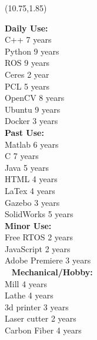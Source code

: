 \documentclass[]{article}
\begin{document}
\begin{textblock}{3}(10.75,1.85)
\colorbox{myblue}
{
\begin{minipage}{6cm}
\hspace{.25cm}
\begin{minipage}{5.5cm}
\begin{flushright}
\vspace*{-0.55cm}
\textbf{Daily Use:}\\
C++ 7 years\\
Python 9 years\\
ROS 9 years\\
Ceres 2 year\\
PCL 5 years \\
OpenCV 8 years\\
Ubuntu 9 years\\
Docker 3 years\\
%
%
\textbf{Past Use:} \\
Matlab 6 years\\
C   7 years\\
Java 5 years\\
HTML 4  years\\
LaTex 4 years \\
Gazebo 3 years\\
 SolidWorks 5 years\\
%
% 
\textbf{Minor Use:}\\
Free RTOS 2 years \\
JavaScript 2 years\\
Adobe Premiere 3 years\\
\-\
%
%
\textbf{Mechanical/Hobby:} \\
Mill 4 years\\
Lathe 4 years\\
3d printer 3 years\\
Laser cutter 2 years\\
Carbon Fiber 4 years\\
\end{flushright}
\end{minipage}
\end{minipage}}
\end{textblock}
%
%  
%
%
\end{document}
